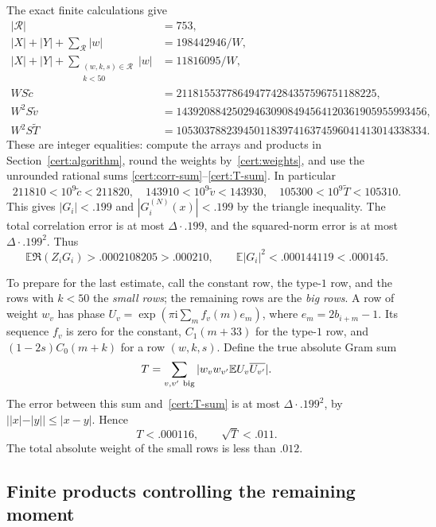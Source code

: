 The exact finite calculations give
\begin{equation}\label{cert:exact-output}
 \begin{aligned}
 |\mathcal R|&=753,\\
 |X|+|Y|+\sum_{\mathcal R}|w|&=198442946/W,\\
 |X|+|Y|+\sum_{\substack{(w,k,s)\in\mathcal R\\k<50}}|w|
     &=11816095/W,\\
 WS\widetilde c&=211815537786494774284357596751188225,\\
 W^2S\widetilde v&=143920884250294630908494564120361905955993456,\\
 W^2S\widetilde T&=105303788239450118397416374596041413014338334.
 \end{aligned}
\end{equation}
These are integer equalities: compute the arrays and products in
Section~\ref{cert:algorithm}, round the weights by~\eqref{cert:weights},
and use the unrounded rational sums
\eqref{cert:corr-sum}--\eqref{cert:T-sum}.  In particular
\[
 211810<10^9\widetilde c<211820,\quad
 143910<10^9\widetilde v<143930,\quad
 105300<10^9\widetilde T<105310.
\]
This gives $|G_i|<.199$ and $|G_i^{(N)}(x)|<.199$ by the triangle
inequality.  The total
correlation error is at most $\Delta\cdot.199$, and the squared-norm
error is at most $\Delta\cdot.199^2$.  Thus
\[
 \mathbb E\Re(Z_iG_i)>.0002108205>.000210,
 \qquad
 \mathbb E|G_i|^2<.000144119<.000145.
\]

To prepare for the last estimate, call the constant row, the type-$1$
row, and the rows with $k<50$ the \emph{small rows}; the remaining
rows are the \emph{big rows}.  A row of weight $w_v$ has phase
$U_v=\exp(\pi\mathrm i\sum_m f_v(m)e_m)$, where
$e_m=2b_{i+m}-1$.  Its sequence $f_v$ is zero for the constant,
$C_1(m+33)$ for the type-$1$ row, and
$(1-2s)C_0(m+k)$ for a row $(w,k,s)$.  Define the true absolute
Gram sum
\begin{equation}\label{cert:true-T}
 T=\sum_{v,v'\ {\rm big}}|w_vw_{v'}\mathbb E U_v\overline{U_{v'}}|.
\end{equation}
The error between this sum and~\eqref{cert:T-sum} is at most
$\Delta\cdot.199^2$, by $||x|-|y||\le|x-y|$.  Hence
\begin{equation}\label{cert:T-bound}
 T<.000116,\qquad \sqrt T<.011.
\end{equation}
The total absolute weight of the small rows is less than $.012$.

\subsection{Finite products controlling the remaining moment}
\label{cert:finite-products}

